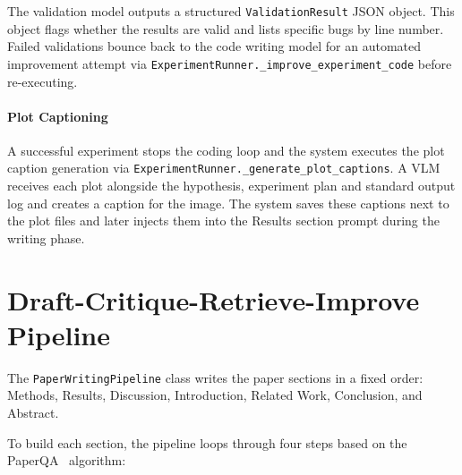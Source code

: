 The validation model outputs a structured \texttt{ValidationResult} JSON object.
This object flags whether the results are valid and lists specific bugs by line number.
Failed validations bounce back to the code writing model for an automated improvement attempt via \texttt{ExperimentRunner.\_improve\_experiment\_code} before re-executing.

\paragraph{Plot Captioning}
A successful experiment stops the coding loop and the system executes the plot caption generation via \texttt{ExperimentRunner.\_generate\_plot\_captions}.
A VLM receives each plot alongside the hypothesis, experiment plan and standard output log and creates a caption for the image.
The system saves these captions next to the plot files and later injects them into the Results section prompt during the writing phase.




\section{Draft-Critique-Retrieve-Improve Pipeline}
The \texttt{PaperWritingPipeline} class writes the paper sections in a fixed order: Methods, Results, Discussion, Introduction, Related Work, Conclusion, and Abstract.

To build each section, the pipeline loops through four steps based on the PaperQA~\cite{skarlinski2024languageagentsachievesuperhuman} algorithm:


